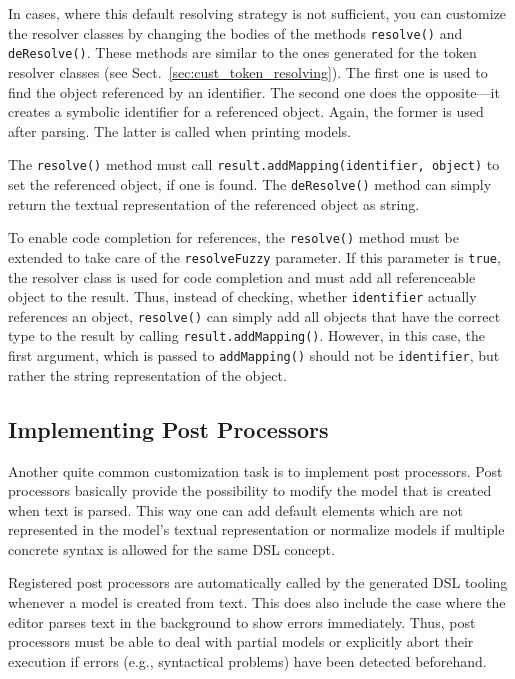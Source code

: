 In cases, where this default resolving strategy is not sufficient, you can
customize the resolver classes by changing the bodies of the methods
\texttt{resolve()} and \texttt{deResolve()}. These methods are similar to the
ones generated for the token resolver classes (see
Sect.~\ref{sec:cust_token_resolving}). The first one is used to find the object
referenced by an identifier. The second one does the opposite---it creates a
symbolic identifier for a referenced object. Again, the former is used after
parsing. The latter is called when printing models.

The \texttt{resolve()} method must call \texttt{result.addMapping(identifier,
object)} to set the referenced object, if one is found. The
\texttt{deResolve()} method can simply return the textual representation of the
referenced object as string.

To enable code completion for references, the \texttt{resolve()} method must be
extended to take care of the \texttt{resolveFuzzy} parameter. If this parameter is
\texttt{true}, the resolver class is used for code completion and must add all
referenceable object to the result. Thus, instead of checking, whether
\texttt{identifier} actually references an object, \texttt{resolve()} can
simply add all objects that have the correct type to the result by calling
\texttt{result.addMapping()}. However, in this case, the first argument, which
is passed to \texttt{addMapping()} should not be \texttt{identifier}, but rather
the string representation of the object.

\subsection{Implementing Post Processors}
\label{sec:cust_post_processors}

Another quite common customization task is to implement post processors. Post
processors basically provide the possibility to modify the model that is
created when text is parsed. This way one can add default elements which are not
represented in the model's textual representation or normalize models if
multiple concrete syntax is allowed for the same DSL concept.

Registered post processors are automatically called by the generated DSL tooling
whenever a model is created from text. This does also include the case where the
editor parses text in the background to show errors immediately. Thus, post
processors must be able to deal with partial models or explicitly abort their
execution if errors (e.g., syntactical problems) have been detected beforehand.

